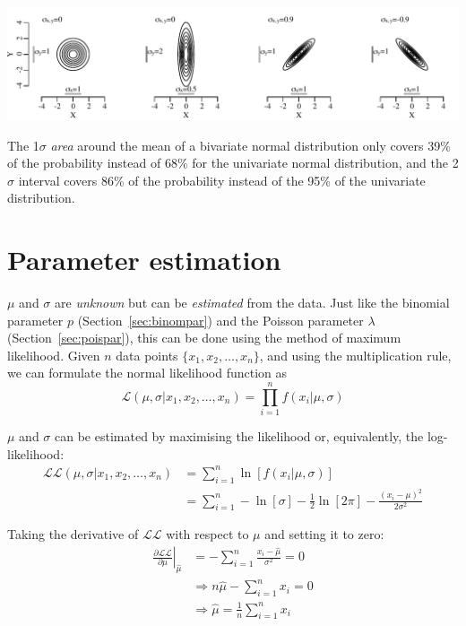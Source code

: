 \noindent\includegraphics[width=\textwidth]{../figures/cov.pdf}
\begingroup {}
\label{fig:cov}
\endgroup

The 1$\sigma$ \emph{area} around the mean of a bivariate normal
distribution only covers 39\% of the probability instead of $68\%$ for
the univariate normal distribution, and the 2$\sigma$ interval covers
86\% of the probability instead of the 95\% of the univariate
distribution.

\section{Parameter estimation}
\label{sec:normalparameters}

$\mu$ and $\sigma$ are \emph{unknown} but can be \emph{estimated} from
the data. Just like the binomial parameter $p$
(Section~\ref{sec:binompar}) and the Poisson parameter $\lambda$
(Section~\ref{sec:poispar}), this can be done using the method of
maximum likelihood.  Given $n$ data points $\{x_1, x_2, \ldots,
x_n\}$, and using the multiplication rule, we can formulate the normal
likelihood function as
\begin{equation}
  \mathcal{L}(\mu,\sigma|x_1,x_2,\ldots,x_n) =
  \prod\limits_{i=1}^{n}f(x_i|\mu,\sigma)
  \label{eq:Lnorm}
\end{equation}

$\mu$ and $\sigma$ can be estimated by maximising the likelihood or,
equivalently, the log-likelihood:
\begin{equation}
  \begin{split}
    \mathcal{LL}(\mu,\sigma|x_1,x_2,\ldots,x_n) & =
    \sum\limits_{i=1}^{n}\ln\left[f(x_i|\mu,\sigma)\right] \\ & =
    \sum\limits_{i=1}^{n} -\ln[\sigma] - \frac{1}{2}\ln[2\pi] -
    \frac{(x_i-\mu)^2}{2\sigma^2}
  \end{split}
  \label{eq:LLnorm}
\end{equation}

Taking the derivative of $\mathcal{LL}$ with respect to $\mu$ and
setting it to zero:
\begin{equation}
  \begin{split}
    \left.\frac{\partial{\mathcal{LL}}}{\partial{\mu}}\right|_{\hat{\mu}} & =
    - \sum\limits_{i=1}^{n} \frac{x_i-\hat{\mu}}{\sigma^2} = 0 \\
    & \Rightarrow n\hat{\mu} - \sum\limits_{i=1}^{n} x_i = 0 \\
    & \Rightarrow \hat{\mu} = \frac{1}{n}\sum\limits_{i=1}^{n}x_i
  \end{split}
\end{equation}

